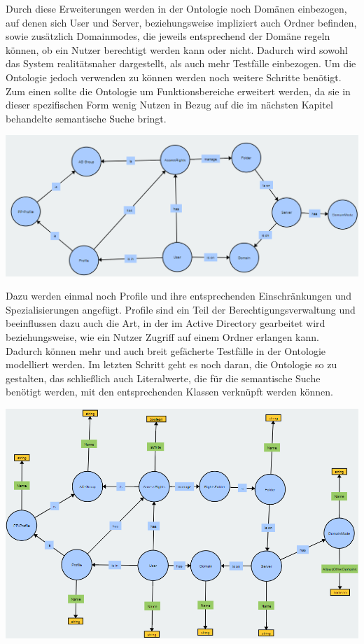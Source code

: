 Durch diese Erweiterungen werden in der Ontologie noch Domänen einbezogen, auf denen sich User und Server, beziehungsweise impliziert auch Ordner befinden, sowie zusätzlich Domainmodes, die jeweils entsprechend der Domäne regeln können, ob ein Nutzer berechtigt werden kann oder nicht. Dadurch wird sowohl das System realitätsnaher dargestellt, als auch mehr Testfälle einbezogen. Um die Ontologie jedoch verwenden zu können werden noch weitere Schritte benötigt. Zum einen sollte die Ontologie um Funktionsbereiche erweitert werden, da sie in dieser spezifischen Form wenig Nutzen in Bezug auf die im nächsten Kapitel behandelte semantische Suche bringt. \\

\begin{center}
    \includegraphics[width=1\textwidth]{Thesis/Images/OntologyProfile.png}
\end{center}

Dazu werden einmal noch Profile und ihre entsprechenden Einschränkungen und Spezialisierungen angefügt. Profile sind ein Teil der Berechtigungsverwaltung und beeinflussen dazu auch die Art, in der im Active Directory gearbeitet wird beziehungsweise, wie ein Nutzer Zugriff auf einem Ordner erlangen kann. Dadurch können mehr und auch breit gefächerte Testfälle in der Ontologie modelliert werden. Im letzten Schritt geht es noch daran, die Ontologie so zu gestalten, das schließlich auch Literalwerte, die für die semantische Suche benötigt werden, mit den entsprechenden Klassen verknüpft werden können. 

\begin{center}
    \includegraphics[width=1\textwidth]{Thesis/Images/OntologyLiterals.png}
\end{center}

